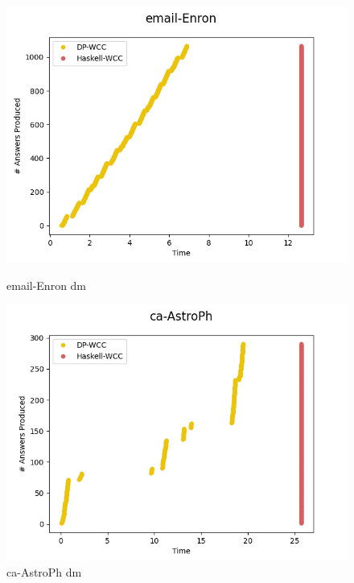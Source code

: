 \documentclass[preprint]{elsarticle}
\begin{document}
\begin{figure}[!htb]
    \centering
    \begin{minipage}{0.33\textwidth}
     \includegraphics[width=1\linewidth, height=0.2\textheight]{email_enron}
      \caption{email-Enron \acrshort{dm}}
      \label{fig:dief:1}
    \end{minipage}%
    \begin{minipage}{0.33\textwidth}
     \includegraphics[width=1\linewidth, height=0.2\textheight]{ca_astroph}
      \caption{ca-AstroPh \acrshort{dm}}
      \label{fig:dief:2}
    \end{minipage}%
    \begin{minipage}{0.33\textwidth}

\end{minipage}
\end{figure}
\end{document}
